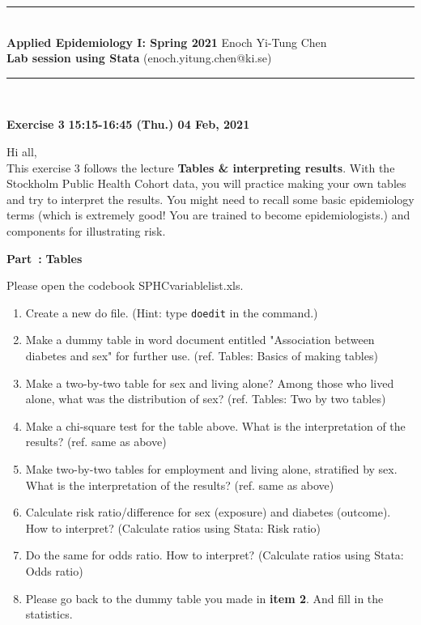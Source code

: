 \documentclass[11pt]{article}
\newcounter{Part}[section]
\newenvironment{Part}[1][]{\refstepcounter{Part}\par\medskip
   \noindent \large \textbf{Part~\thePart #1: }}{\medskip}
\begin{document}
\begin{flushleft}
    \rule[1mm]{\linewidth}{1.5pt} \\
    \large \textbf{Applied Epidemiology I: Spring 2021} \hfill \large Enoch Yi-Tung Chen \\
    \large  \textbf{Lab session using Stata}
    \hfill (enoch.yitung.chen@ki.se) \\
       \rule[1mm]{\linewidth}{1.5pt} \\
\end{flushleft}

\noindent \large{\textbf{Exercise 3}} \hfill \normalsize \textbf{15:15-16:45 (Thu.) 04 Feb, 2021}
\medskip

\noindent  Hi all, \\
This exercise 3 follows the lecture \textbf{Tables \& interpreting results}. With the Stockholm Public Health Cohort data, you will practice making your own tables and try to interpret the results. You might need to recall some basic epidemiology terms (which is extremely good! You are trained to become epidemiologists.) and components for illustrating risk. 
\medskip

\begin{Part}
\textbf{Tables}
\end{Part}

\noindent Please open the codebook SPHC\textunderscore variable\textunderscore list.xls. 

\begin{enumerate}
	\item Create a new do file. (Hint: type \verb|doedit| in the command.)
	\item Make a dummy table in word document entitled "Association between diabetes and sex" for further use. (ref. Tables: Basics of making tables)
	\item Make a two-by-two table for sex and living alone? Among those who lived alone, what was the distribution of sex?  (ref. Tables: Two by two tables)
	\item Make a chi-square test for the table above. What is the interpretation of the results? (ref. same as above)
	\item Make two-by-two tables for employment and living alone, stratified by sex. What is the interpretation of the results? (ref. same as above)
	\item Calculate risk ratio/difference for sex (exposure) and diabetes (outcome). How to interpret? (Calculate ratios using Stata: Risk ratio)
	\item Do the same for odds ratio. How to interpret? (Calculate ratios using Stata: Odds ratio)
	\item Please go back to the dummy table you made in \textbf{item 2}. And fill in the statistics.
	\end{enumerate}
\end{document}
